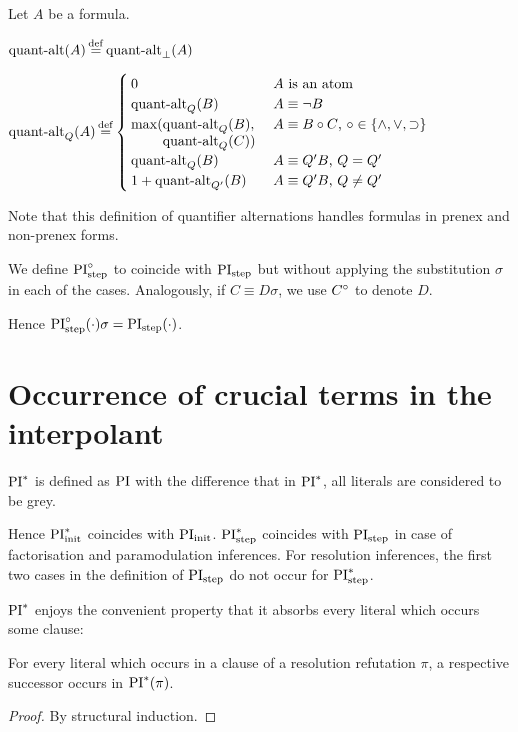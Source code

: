 \documentclass[,%
	draft=false,%
	numbers=noendperiod
	12pt,
	a4paper,
	oneside,%
	openany,
]{memoir}
\begin{document}
\begin{defi}
	Let $A$ be a formula.\nopagebreak
	\medskip

	\noindent
	$\qa(A) \defeq \qa_\bot(A)$
	\nopagebreak
	\medskip

	\noindent
	$
	\qa_Q(A) \defeq 
	\begin{cases}
		0 & \text{$A$ is an atom} \\
		\qa_Q(B) & \text{$A \equiv \lnot B$} \\
		\max(\parbox[t]{0.2\textwidth}{$\qa_Q(B),$\newline$ \qa_Q(C))$} & \text{$A \equiv B \circ C$, $\circ \in \{\land, \lor, \limpl\}$} \\
		\qa_Q(B) & \text{$A \equiv Q' B$, $Q = Q'$} \\
		1+\qa_{Q'}(B) & \text{$A \equiv Q' B$, $Q \neq Q'$}  \\
	\end{cases}
	$
	\nopagebreak

	\qedhere
\end{defi}
Note that this definition of quantifier alternations handles formulas in prenex and non-prenex forms.

\begin{defi}
	We define $\operatorname{PI}^{\circ}_{\mathrm{step}}$ to coincide with $\operatorname{PI}_{\mathrm{step}}$ but without applying the substitution $\sigma$ in each of the cases.
	Analogously, if $C \equiv D\sigma$, we use $C^\circ$ to denote $D$.
\end{defi}
Hence $\operatorname{PI}^{\circ}_{\mathrm{step}}(\cdot) \sigma = \operatorname{PI}_{\mathrm{step}}(\cdot)$.


\section{Occurrence of crucial terms in the interpolant}

\begin{defi}[$\PI^*$]
	$\PI^*$ is defined as $\operatorname{PI}$ with the difference that in $\PI^*$, all literals are considered to be grey.
\end{defi}

Hence $\operatorname{PI}_{\mathrm{init}}^*$ coincides with $\operatorname{PI}_{\mathrm{init}}$.
$\operatorname{PI}_{\mathrm{step}}^*$ coincides with $\operatorname{PI}_{\mathrm{step}}$ in case of factorisation and paramodulation inferences.
For resolution inferences, the first two cases in the definition of $\operatorname{PI}_{\mathrm{step}}$ do not occur for $\operatorname{PI}_{\mathrm{step}}^*$.

$\PI^*$ enjoys the convenient property that it absorbs every literal which occurs some clause:

\begin{prop}
	For every literal which occurs in a clause of a resolution refutation $\pi$, a respective successor occurs in $\operatorname{PI}^*(\pi)$.
\end{prop}
\begin{proof}
	By structural induction.
\end{proof}
\end{document}
